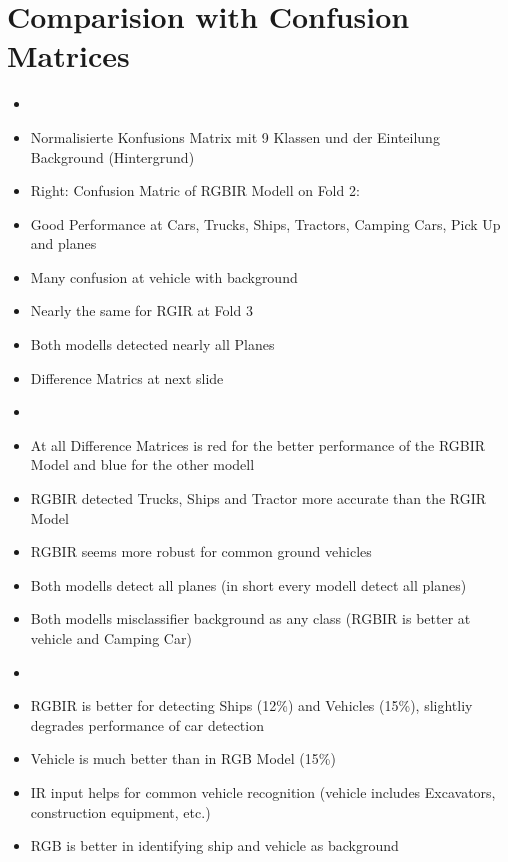 \section{Comparision with Confusion Matrices}
\begin{itemize}
    \item {}
    \item Normalisierte Konfusions Matrix mit 9 Klassen und der Einteilung Background (Hintergrund)
    \item Right: Confusion Matric of RGBIR Modell on Fold 2:
    \item Good Performance at Cars, Trucks, Ships, Tractors, Camping Cars, Pick Up and planes
    \item Many confusion at vehicle with background
    \item Nearly the same for RGIR at Fold 3
    \item Both modells detected nearly all Planes
    \item Difference Matrics at next slide
\end{itemize}

\begin{itemize}
    \item {}
    \item At all Difference Matrices is red for the better performance of the RGBIR Model and blue for the other modell
    \item RGBIR detected Trucks, Ships and Tractor more accurate than the RGIR Model
    \item RGBIR seems more robust for common ground vehicles
    \item Both modells detect all planes (in short every modell detect all planes)
    \item Both modells misclassifier background as any class (RGBIR is better at vehicle and Camping Car) 
\end{itemize}

\begin{itemize}
    \item {}
    \item RGBIR is better for detecting Ships (12\%) and Vehicles (15\%), slightliy degrades performance of car detection
    \item Vehicle is much better than in RGB Model (15\%)
    \item IR input helps for common vehicle recognition (vehicle includes Excavators, construction equipment, etc.)
    \item RGB is better in identifying ship and vehicle as background
\end{itemize}


